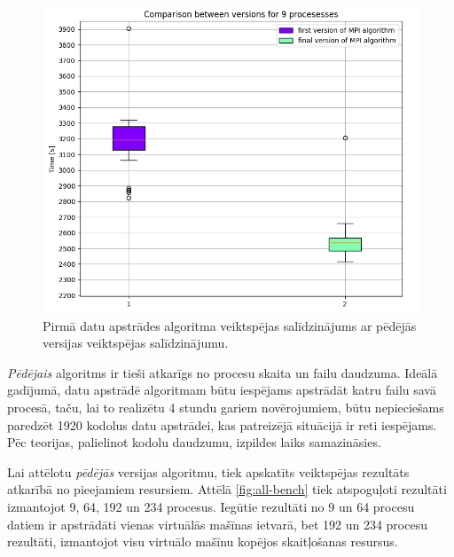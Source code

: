 \begin{figure}[H]
\centering
\includegraphics[width=\textwidth]{images/created/old-v-new.png}
\caption{Pirmā datu apstrādes algoritma veiktspējas salīdzinājums ar pēdējās versijas veiktspējas salīdzinājumu.}
\label{fig:old-v-new}
\end{figure}


\textit{Pēdējais} algoritms ir tieši atkarīgs no procesu skaita un failu daudzuma. Ideālā gadījumā, datu apstrādē algoritmam būtu iespējams  apstrādāt katru failu savā procesā, taču, lai to realizētu 4 stundu gariem novērojumiem, būtu nepieciešams paredzēt 1920 kodolus datu apstrādei, kas patreizējā situācijā ir reti iespējams. Pēc teorijas, palielinot kodolu daudzumu, izpildes laiks samazināsies.

Lai attēlotu \textit{pēdējās} versijas algoritmu, tiek apskatīts veiktspējas rezultāts atkarībā no pieejamiem resursiem. Attēlā \ref{fig:all-bench} tiek atspoguļoti rezultāti izmantojot 9, 64, 192 un 234 procesus. Iegūtie rezultāti no 9 un 64 procesu datiem ir apstrādāti vienas virtuālās mašīnas ietvarā, bet 192 un 234 procesu rezultāti, izmantojot visu virtuālo mašīnu kopējos skaitļošanas resursus. 






